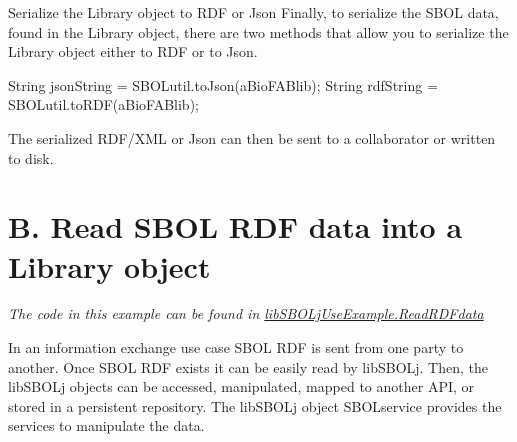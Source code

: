\begin{DoxyEnumerate}
\item \begin{DoxyParagraph}{Serialize the Library object to RDF or Json}
Finally, to serialize the SBOL data, found in the Library object, there are two methods that allow you to serialize the Library object either to RDF or to Json. 
\begin{DoxyCode}
String jsonString = SBOLutil.toJson(aBioFABlib);
String rdfString = SBOLutil.toRDF(aBioFABlib);
\end{DoxyCode}

\end{DoxyParagraph}
The serialized RDF/XML or Json can then be sent to a collaborator or written to disk.
\end{DoxyEnumerate}



 \hypertarget{tutorial_B}{}\section{B. Read SBOL RDF data into a Library object}\label{tutorial_B}
{\itshape The code in this example can be found in \hyperlink{classlib_s_b_o_lj_use_example_1_1_read_r_d_fdata}{libSBOLjUseExample.ReadRDFdata}\/}

In an information exchange use case SBOL RDF is sent from one party to another. Once SBOL RDF exists it can be easily read by libSBOLj. Then, the libSBOLj objects can be accessed, manipulated, mapped to another API, or stored in a persistent repository. The libSBOLj object SBOLservice provides the services to manipulate the data.


